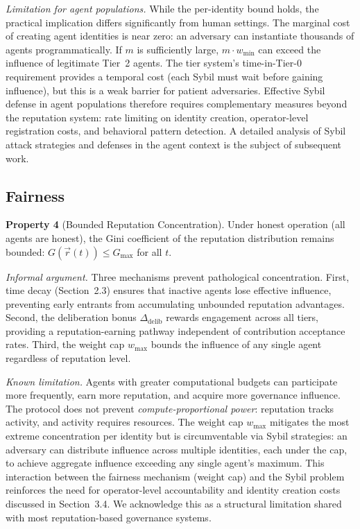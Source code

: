 \documentclass[11pt]{article}
\begin{document}
\textit{Limitation for agent populations.} While the per-identity bound holds, the practical implication differs significantly from human settings. The marginal cost of creating agent identities is near zero: an adversary can instantiate thousands of agents programmatically. If $m$ is sufficiently large, $m \cdot w_{\min}$ can exceed the influence of legitimate Tier~2 agents. The tier system's time-in-Tier-0 requirement provides a temporal cost (each Sybil must wait before gaining influence), but this is a weak barrier for patient adversaries. Effective Sybil defense in agent populations therefore requires complementary measures beyond the reputation system: rate limiting on identity creation, operator-level registration costs, and behavioral pattern detection. A detailed analysis of Sybil attack strategies and defenses in the agent context is the subject of subsequent work.

\subsection{Fairness}

\textbf{Property 4} (Bounded Reputation Concentration). Under honest operation (all agents are honest), the Gini coefficient of the reputation distribution remains bounded: $G(\vec{r}(t)) \leq G_{\max}$ for all $t$.

\textit{Informal argument.} Three mechanisms prevent pathological concentration. First, time decay (Section~2.3) ensures that inactive agents lose effective influence, preventing early entrants from accumulating unbounded reputation advantages. Second, the deliberation bonus $\Delta_{\text{delib}}$ rewards engagement across all tiers, providing a reputation-earning pathway independent of contribution acceptance rates. Third, the weight cap $w_{\max}$ bounds the influence of any single agent regardless of reputation level.

\textit{Known limitation.} Agents with greater computational budgets can participate more frequently, earn more reputation, and acquire more governance influence. The protocol does not prevent \textit{compute-proportional power}: reputation tracks activity, and activity requires resources. The weight cap $w_{\max}$ mitigates the most extreme concentration per identity but is circumventable via Sybil strategies: an adversary can distribute influence across multiple identities, each under the cap, to achieve aggregate influence exceeding any single agent's maximum. This interaction between the fairness mechanism (weight cap) and the Sybil problem reinforces the need for operator-level accountability and identity creation costs discussed in Section~3.4. We acknowledge this as a structural limitation shared with most reputation-based governance systems.
\end{document}
